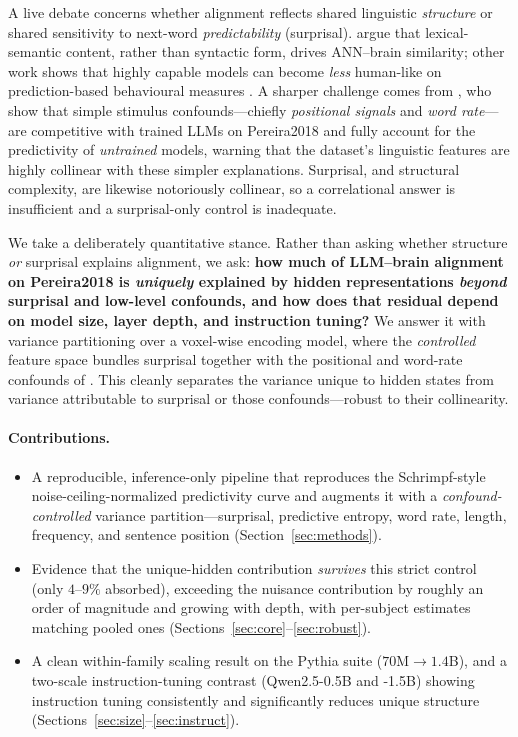 \documentclass{article}
\begin{document}
A live debate concerns whether alignment reflects shared linguistic \emph{structure} or shared
sensitivity to next-word \emph{predictability} (surprisal). \citet{kauf2023} argue that
lexical-semantic content, rather than syntactic form, drives ANN--brain similarity; other work
shows that highly capable models can become \emph{less} human-like on prediction-based
behavioural measures \citep{superhuman2025}. A sharper challenge comes from
\citet{feghhi2024}, who show that simple stimulus confounds---chiefly \emph{positional signals}
and \emph{word rate}---are competitive with trained LLMs on Pereira2018 and fully account for
the predictivity of \emph{untrained} models, warning that the dataset's linguistic features are
highly collinear with these simpler explanations. Surprisal, and structural complexity, are
likewise notoriously collinear, so a correlational answer is insufficient and a surprisal-only
control is inadequate.

We take a deliberately quantitative stance. Rather than asking whether structure \emph{or}
surprisal explains alignment, we ask: \textbf{how much of LLM--brain alignment on Pereira2018 is
\emph{uniquely} explained by hidden representations \emph{beyond} surprisal and low-level
confounds, and how does that residual depend on model size, layer depth, and instruction
tuning?} We answer it with variance partitioning over a voxel-wise encoding model, where the
\emph{controlled} feature space bundles surprisal together with the positional and word-rate
confounds of \citet{feghhi2024}. This cleanly separates the variance unique to hidden states
from variance attributable to surprisal or those confounds---robust to their collinearity.

\paragraph{Contributions.}
\begin{itemize}
  \item A reproducible, inference-only pipeline that reproduces the Schrimpf-style
  noise-ceiling-normalized predictivity curve and augments it with a \emph{confound-controlled}
  variance partition---surprisal, predictive entropy, word rate, length, frequency, and
  sentence position (Section~\ref{sec:methods}).
  \item Evidence that the unique-hidden contribution \emph{survives} this strict control
  (only $4$--$9\%$ absorbed), exceeding the nuisance contribution by roughly an order of
  magnitude and growing with depth, with per-subject estimates matching pooled ones
  (Sections~\ref{sec:core}--\ref{sec:robust}).
  \item A clean within-family scaling result on the Pythia suite ($70$M$\rightarrow$$1.4$B),
  and a two-scale instruction-tuning contrast (Qwen2.5-0.5B and -1.5B) showing instruction
  tuning consistently and significantly reduces unique structure
  (Sections~\ref{sec:size}--\ref{sec:instruct}).
\end{itemize}
\end{document}
